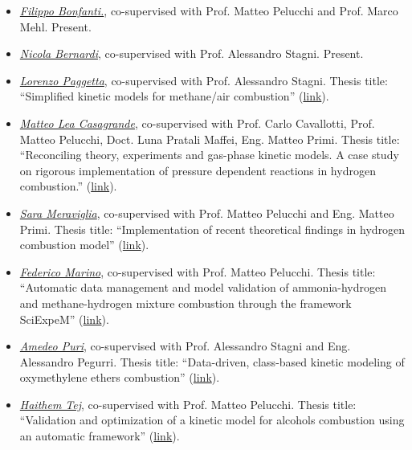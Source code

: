 
\begin{itemize}
    \item [ ] \ul{\it Filippo Bonfanti.}, co-supervised with Prof. Matteo Pelucchi and
          Prof. Marco Mehl. Present.

    \item [ ] \ul{\it Nicola Bernardi}, co-supervised with Prof. Alessandro Stagni.
          Present.

    \item [ ] \ul{\it Lorenzo Paggetta}, co-supervised with Prof. Alessandro Stagni.
          Thesis title: ``Simplified kinetic models for methane/air combustion''
          (\href{https://hdl.handle.net/10589/230242}{link}).

    \item [ ] \ul{\it Matteo Lea Casagrande}, co-supervised with Prof. Carlo Cavallotti,
          Prof. Matteo Pelucchi, Doct. Luna Pratali Maffei, Eng. Matteo Primi. Thesis title:
          ``Reconciling theory, experiments and gas-phase kinetic models. A case study on
          rigorous implementation of pressure dependent reactions in hydrogen combustion.''
          (\href{https://hdl.handle.net/10589/226533}{link}).

    \item [ ] \ul{\it Sara Meraviglia}, co-supervised with Prof. Matteo Pelucchi and Eng.
          Matteo Primi. Thesis title: ``Implementation of recent theoretical findings in
          hydrogen combustion model'' (\href{https://hdl.handle.net/10589/214934}{link}).

    \item [ ] \ul{\it Federico Marino}, co-supervised with Prof. Matteo Pelucchi. Thesis
          title: ``Automatic data management and model validation of ammonia-hydrogen and
          methane-hydrogen mixture combustion through the framework SciExpeM''
          (\href{https://hdl.handle.net/10589/212616}{link}).

    \item [ ] \ul{\it Amedeo Puri}, co-supervised with Prof. Alessandro Stagni and Eng.
          Alessandro Pegurri. Thesis title: ``Data-driven, class-based kinetic modeling of
          oxymethylene ethers combustion'' (\href{https://hdl.handle.net/10589/206686}{link}).

    \item [ ] \ul{\it Haithem Tej}, co-supervised with Prof. Matteo Pelucchi. Thesis title:
          ``Validation and optimization of a kinetic model for alcohols combustion using an
          automatic framework'' (\href{https://hdl.handle.net/10589/210401}{link}).

\end{itemize}
